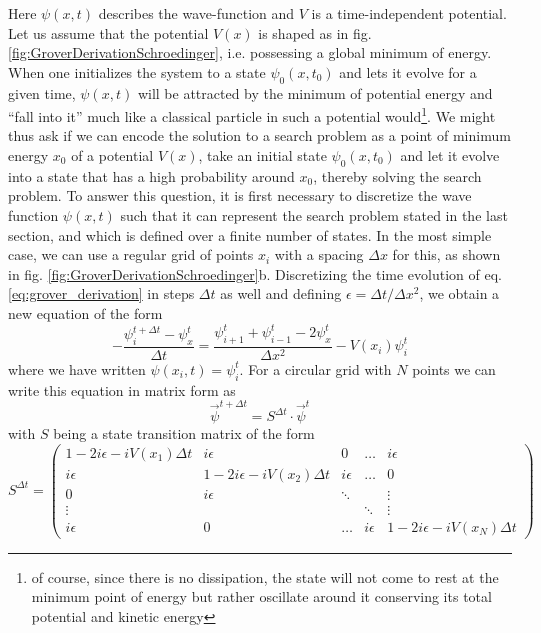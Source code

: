 Here $\psi(x,t)$ describes the wave-function and $V$ is a time-independent potential. Let us assume that the potential $V(x)$ is shaped as in fig. \ref{fig:GroverDerivationSchroedinger}, i.e. possessing a global minimum of energy. When one initializes the system to a state $\psi_0(x,t_0)$ and lets it evolve for a given time, $\psi(x,t)$ will be attracted by the minimum of potential energy and ``fall into it'' much like a classical particle in such a potential would\footnote{of course, since there is no dissipation, the state will not come to rest at the minimum point of energy but rather oscillate around it conserving its total potential and kinetic energy}. We might thus ask if we can encode the solution to a search problem as a point of minimum energy $x_0$ of a potential $V(x)$, take an initial state $\psi_0(x,t_0)$ and let it evolve into a state that has a high probability around $x_0$, thereby solving the search problem. To answer this question, it is first necessary to discretize the wave function $\psi(x,t)$ such that it can represent the search problem stated in the last section, and which is defined over a finite number of states. In the most simple case, we can use a regular grid of points $x_i$ with a spacing $\Delta x$ for this, as shown in fig. \ref{fig:GroverDerivationSchroedinger}b. Discretizing the time evolution of eq. \ref{eq:grover_derivation} in steps $\Delta t$ as well and defining $\epsilon = \Delta t/\Delta x^2$, we obtain a new equation of the form
%
\begin{equation}
-\frac{\psi_i^{t+\Delta t}-\psi_x^{t}}{\Delta t} = \frac{\psi_{i+1}^t+\psi_{i-1}^t-2\psi_x^t}{\Delta x^2} -V(x_i)\psi_i^t
\end{equation}
%
where we have written $\psi(x_i,t)=\psi_i^t$. For a circular grid with $N$ points we can write this equation in matrix form as
%
\begin{equation}
\vec{\psi}^{t+\Delta t} = S^{\Delta t}  \cdot \vec{\psi}^t
\end{equation}
%
with $S$ being a state transition matrix of the form
%
\begin{equation}
S^{\Delta t} = \left(
	\begin{array}{ccccc}
		1-2i\epsilon-iV(x_1)\Delta t & i\epsilon & 0 & \hdots &  i\epsilon \\
		i \epsilon & 1-2i\epsilon -iV(x_2)\Delta t & i\epsilon & \hdots & 0 \\
		0 & i\epsilon & \ddots & & \vdots \\
		\vdots & & & \ddots  & \vdots \\
		i \epsilon & 0 & \hdots & i\epsilon & 1 - 2i\epsilon -iV(x_N)\Delta t
	\end{array}
 \right) \label{eq:grover_iteration_matrix}
\end{equation}
